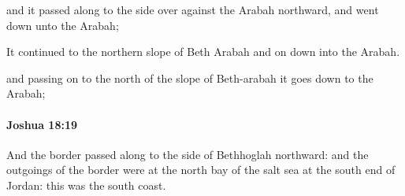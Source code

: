			\begin{versebox}
					\item[BHS] 
					\item[ASV] and it passed along to the side over against the Arabah northward, and went down unto the Arabah;
					\item[NIV] It continued to the northern slope of Beth Arabah and on down into the Arabah.
					\item[NRSV] and passing on to the north of the slope of Beth-arabah it goes down to the Arabah;
			\end{versebox}

		\paragraph{Joshua 18:19} %
			\label{JOSHUA-18-19}

			And the border passed along to the side of Bethhoglah northward: and the outgoings of the border were at the north bay of the salt sea at the south end of Jordan: this was the south coast.

